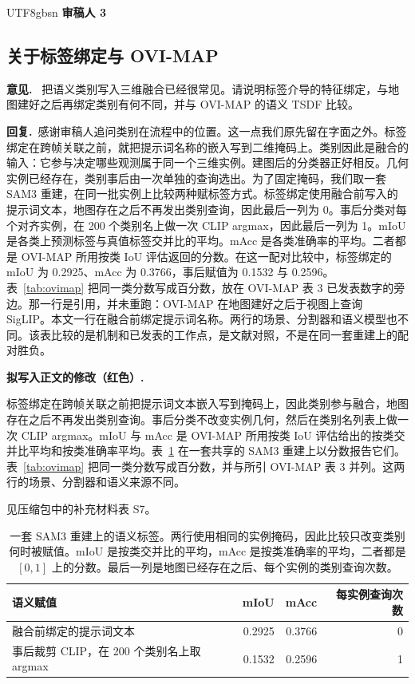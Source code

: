 \documentclass[11pt]{article}
\newcommand{\revcomment}[1]{%
  \par\vspace{0.6em}\noindent\textcolor{revblue}{\textbf{意见.}}\ %
  \textcolor{revblue}{#1}\par\vspace{0.4em}}
\newcommand{\revresponse}[1]{%
  \par\noindent\textbf{回复.}\ #1\par\vspace{0.3em}}
\newcommand{\revchange}[1]{%
  \par\noindent\textbf{拟写入正文的修改（红色）.}\par
  \noindent\textcolor{revred}{#1}\par\vspace{0.8em}}
\begin{document}
\begin{CJK*}{UTF8}{gbsn}
\bigskip
\noindent\textcolor{revblue}{\large\textbf{审稿人 3}}

\subsection*{关于标签绑定与 OVI-MAP}

\revcomment{把语义类别写入三维融合已经很常见。请说明标签介导的特征绑定，与地图建好之后再绑定类别有何不同，并与 OVI-MAP 的语义 TSDF 比较。}

\revresponse{感谢审稿人追问类别在流程中的位置。这一点我们原先留在字面之外。标签绑定在跨帧关联之前，就把提示词名称的嵌入写到二维掩码上。类别因此是融合的输入：它参与决定哪些观测属于同一个三维实例。建图后的分类器正好相反。几何实例已经存在，类别事后由一次单独的查询选出。为了固定掩码，我们取一套 SAM3 重建，在同一批实例上比较两种赋标签方式。标签绑定使用融合前写入的提示词文本，地图存在之后不再发出类别查询，因此最后一列为 0。事后分类对每个对齐实例，在 200 个类别名上做一次 CLIP argmax，因此最后一列为 1。mIoU 是各类上预测标签与真值标签交并比的平均。mAcc 是各类准确率的平均。二者都是 OVI-MAP 所用按类 IoU 评估返回的分数。在这一配对比较中，标签绑定的 mIoU 为 0.2925、mAcc 为 0.3766，事后赋值为 0.1532 与 0.2596。表~\ref{tab:ovimap} 把同一类分数写成百分数，放在 OVI-MAP 表 3 已发表数字的旁边。那一行是引用，并未重跑：OVI-MAP 在地图建好之后于视图上查询 SigLIP。本文一行在融合前绑定提示词名称。两行的场景、分割器和语义模型也不同。该表比较的是机制和已发表的工作点，是文献对照，不是在同一套重建上的配对胜负。}

\revchange{标签绑定在跨帧关联之前把提示词文本嵌入写到掩码上，因此类别参与融合，地图存在之后不再发出类别查询。事后分类不改变实例几何，然后在类别名列表上做一次 CLIP argmax。mIoU 与 mAcc 是 OVI-MAP 所用按类 IoU 评估给出的按类交并比平均和按类准确率平均。表~\ref{tab:bind} 在一套共享的 SAM3 重建上以分数报告它们。表~\ref{tab:ovimap} 把同一类分数写成百分数，并与所引 OVI-MAP 表 3 并列。这两行的场景、分割器和语义来源不同。}

\noindent 见压缩包中的补充材料表 S7。

\begin{table}[ht]
\centering
\caption{一套 SAM3 重建上的语义标签。两行使用相同的实例掩码，因此比较只改变类别何时被赋值。mIoU 是按类交并比的平均，mAcc 是按类准确率的平均，二者都是 \([0,1]\) 上的分数。最后一列是地图已经存在之后、每个实例的类别查询次数。}
\label{tab:bind}
\small
\begin{tabular}{lrrr}
\toprule
语义赋值 & mIoU & mAcc & 每实例查询次数 \\
\midrule
融合前绑定的提示词文本 & 0.2925 & 0.3766 & 0 \\
事后裁剪 CLIP，在 200 个类别名上取 argmax & 0.1532 & 0.2596 & 1 \\
\bottomrule
\end{tabular}
\end{table}


\end{CJK*}
\end{document}
